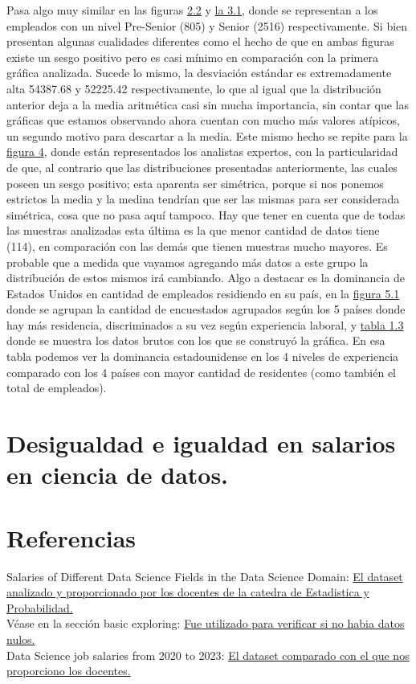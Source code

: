 \documentclass{article}
\begin{document}
Pasa algo muy similar en las figuras \hyperref[figura 2.2 diagrama]{2.2} y \hyperref[figura 3.1 diagrama]{la 3.1}, donde se representan a los empleados con un nivel Pre-Senior (805) y Senior (2516) respectivamente. Si bien presentan algunas cualidades diferentes como el hecho de que en ambas figuras existe un sesgo positivo pero es casi mínimo en comparación con la primera gráfica analizada. Sucede lo mismo, la desviación estándar es extremadamente alta 54387.68 y 52225.42 respectivamente, lo que al igual que la distribución anterior deja a la media aritmética casi sin mucha importancia, sin contar que las gráficas que estamos observando ahora cuentan con mucho más valores atípicos, un segundo motivo para descartar a la media. Este mismo hecho se repite para la \hyperref[figura 4.1 diagrama]{figura 4}, donde están representados los analistas expertos, con la particularidad de que, al contrario que las distribuciones presentadas anteriormente, las cuales poseen un sesgo positivo; esta aparenta ser simétrica, porque si nos ponemos estrictos la media y la medina tendrían que ser las mismas para ser considerada simétrica, cosa que no pasa aquí tampoco. Hay que tener en cuenta que de todas las muestras analizadas esta última es la que menor cantidad de datos tiene (114), en comparación con las demás que tienen muestras mucho mayores. Es probable que a medida que vayamos agregando más datos a este grupo la distribución de estos mismos irá cambiando.
Algo a destacar es la dominancia de Estados Unidos en cantidad de empleados residiendo en su país, en la \hyperref[figura 5.1 grafico de barras agrupado]{figura 5.1} donde se agrupan la cantidad de encuestados agrupados según los 5 países donde hay más residencia, discriminados a su vez según experiencia laboral, y \hyperref[tabla 1.3]{tabla 1.3} donde se muestra los datos brutos con los que se construyó la gráfica. En esa tabla podemos ver la dominancia estadounidense en los 4 niveles de experiencia comparado con los 4 países con mayor cantidad de residentes (como también el total de empleados).
	\section{Desigualdad e igualdad en salarios en ciencia de datos.}
	\section{Referencias}
	
	\begin{center}
	Salaries of Different Data Science Fields in the Data Science Domain: \href{https://www.kaggle.com/datasets/arnabchaki/data-science-salaries-2023}{El dataset analizado y proporcionado por los docentes de la catedra de Estadistica y Probabilidad.}\\ Véase en la sección basic exploring: \href{https://www.kaggle.com/code/mudassarshaheen/data-science-salaries-eda-visualization#Employment-Types-}{Fue utilizado para verificar si no habia datos nulos.} \\ Data Science job salaries from 2020 to 2023: \href{https://www.kaggle.com/datasets/cedricaubin/ai-ml-salaries}{El dataset comparado con el que nos proporciono los docentes.}
	\end{center}
\end{document}
